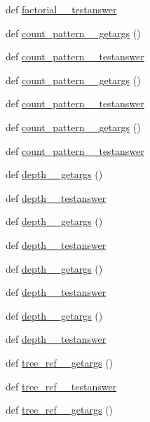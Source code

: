 \begin{DoxyCompactItemize}
\item 
def \hyperlink{namespacetests_a404dab22b2b8cd0e6ba36134fd23d902}{factorial\+\_\+\_\+testanswer}
\item 
def \hyperlink{namespacetests_a46d7dfdf9f54f966d60c13ca46a6d222}{count\+\_\+pattern\+\_\+\_\+getargs} ()
\item 
def \hyperlink{namespacetests_ad0f847d6bdab373a7bb6ebfecaace3d7}{count\+\_\+pattern\+\_\+\_\+testanswer}
\item 
def \hyperlink{namespacetests_a6b9b5cc15ad6bb81c87d777d53ce4e48}{count\+\_\+pattern\+\_\+\_\+getargs} ()
\item 
def \hyperlink{namespacetests_a876360ac780b4f8b0b021f41e697f500}{count\+\_\+pattern\+\_\+\_\+testanswer}
\item 
def \hyperlink{namespacetests_ac0cbd93d17a4728edf8f5216b72b9f95}{count\+\_\+pattern\+\_\+\_\+getargs} ()
\item 
def \hyperlink{namespacetests_aa81b17d6f67851d564e9945594a19623}{count\+\_\+pattern\+\_\+\_\+testanswer}
\item 
def \hyperlink{namespacetests_a8f1916b852ef2a55b77ecfbb33f1c47c}{depth\+\_\+\_\+getargs} ()
\item 
def \hyperlink{namespacetests_a04d0e20680af29258841bc506d83f371}{depth\+\_\+\_\+testanswer}
\item 
def \hyperlink{namespacetests_a109ef87a0ab507dd3956c023dee74061}{depth\+\_\+\_\+getargs} ()
\item 
def \hyperlink{namespacetests_a4518c6cad7db3b660d12a66ce1de60ec}{depth\+\_\+\_\+testanswer}
\item 
def \hyperlink{namespacetests_aa3574532c13baa88ddbba839020020d4}{depth\+\_\+\_\+getargs} ()
\item 
def \hyperlink{namespacetests_a6a2a95b0709cb49d754677218b88bfe6}{depth\+\_\+\_\+testanswer}
\item 
def \hyperlink{namespacetests_a3a7cde3949772c654758eb81e732664b}{depth\+\_\+\_\+getargs} ()
\item 
def \hyperlink{namespacetests_a68d94a8d4d5b9c566b521068d42ea185}{depth\+\_\+\_\+testanswer}
\item 
def \hyperlink{namespacetests_a8eb6bc66f7ca57af2e291cd1ee6f3026}{tree\+\_\+ref\+\_\+\_\+getargs} ()
\item 
def \hyperlink{namespacetests_a7cd34316f7ea9a86b2c8be070202fc2b}{tree\+\_\+ref\+\_\+\_\+testanswer}
\item 
def \hyperlink{namespacetests_aaabca27b5fa89a75461a59b8ad115580}{tree\+\_\+ref\+\_\+\_\+getargs} ()

\end{DoxyCompactItemize}
